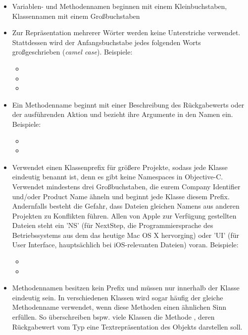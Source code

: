 \documentclass[parskip=half, final]{scrreprt}
\begin{document}
\begin{itemize}
\item Variablen- und Methodennamen beginnen mit einem Kleinbuchstaben, Klassennamen mit einem Großbuchstaben
\item Zur Repräsentation mehrerer Wörter werden keine Unterstriche verwendet. Stattdessen wird der Anfangsbuchstabe jedes folgenden Worts großgeschrieben (\emph{camel case}). Beispiele:
\begin{itemize}
\item {}
\item {}
\item {}
\end{itemize}
\item Ein Methodenname beginnt mit einer Beschreibung des Rückgabewerts oder der ausführenden Aktion und bezieht ihre Argumente in den Namen ein. Beispiele:
\begin{itemize}
\item {}
\item {}
\end{itemize}
\item Verwendet einen Klassenprefix für größere Projekte, sodass jede Klasse eindeutig benannt ist, denn es gibt keine Namespaces in Objective-C. Verwendet mindestens drei Großbuchstaben, die eurem Company Identifier und/oder Product Name ähneln und beginnt jede Klasse diesem Prefix. Andernfalls besteht die Gefahr, dass Dateien gleichen Namens aus anderen Projekten zu Konflikten führen. Allen von Apple zur Verfügung gestellten Dateien steht ein 'NS' (für NextStep, die Programmiersprache des Betriebssystems aus dem das heutige Mac OS X hervorging) oder 'UI' (für User Interface, hauptsächlich bei iOS-relevanten Dateien) voran. Beispiele:
\begin{itemize}
\item {}
\item {}
\end{itemize}
\item Methodennamen besitzen kein Prefix und müssen nur innerhalb der Klasse eindeutig sein. In verschiedenen Klassen wird sogar häufig der gleiche Methodenname verwendet, wenn diese Methoden einen ähnlichen Sinn erfüllen. So überschreiben bspw. viele Klassen die Methode , deren Rückgabewert vom Typ  eine Textrepräsentation des Objekts darstellen soll.

\end{itemize}
\end{document}
